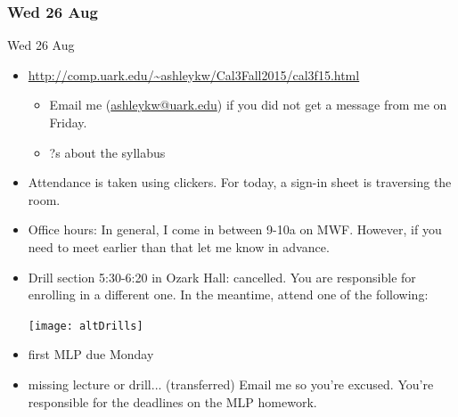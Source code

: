 \documentclass[12pt]{beamer}
\theoremstyle{plain}
\theoremstyle{definition}
\newtheorem{exe}{Exercise}
\begin{document}
\subsubsection{Wed 26 Aug}
\begin{frame}{Wed 26 Aug}
\begin{itemize}
\item \url{http://comp.uark.edu/~ashleykw/Cal3Fall2015/cal3f15.html}
	\begin{itemize}
	\item Email me (\url{ashleykw@uark.edu}) if you did not get a message from me on Friday.
	\item ?s about the syllabus
	\end{itemize}
\item Attendance is taken using clickers.  For today, a sign-in sheet is traversing the room.  
\item Office hours: In general, I come in between 9-10a on MWF.  However, if you need to meet earlier than that let me know in advance.
\end{itemize}
\end{frame}

\begin{frame}{}
\begin{itemize}
\item Drill section 5:30-6:20 in Ozark Hall: cancelled.  You are responsible for enrolling in a different one.  In the meantime, attend one of the following:
\begin{center}
\texttt{[image: altDrills]}
\end{center}
\end{itemize}
\end{frame}

\begin{frame}
\begin{itemize}
\item first MLP due Monday
\item missing lecture or drill... (transferred) Email me so you're excused.  You're responsible for the deadlines on the MLP homework.
\end{itemize}
\end{frame}

\end{document}
